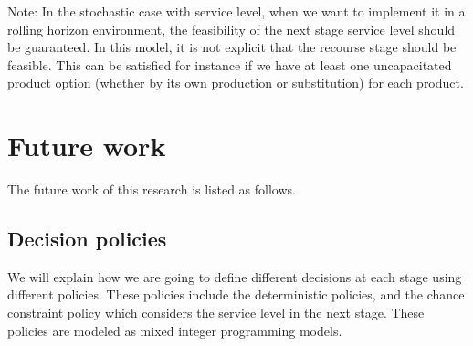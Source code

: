 \documentclass[10pt]{article}
\newcommand{\Es}{S} %
\newcommand{\cred}{\color{red!65!black}}
\begin{document}
 Note: In the stochastic case with service level, when we want to implement it in a rolling horizon environment, the feasibility of the next stage service level should be guaranteed.  In this model, it is not explicit that the recourse stage should be feasible. This can be satisfied for instance if we have at least one uncapacitated product option (whether by its own production or substitution) for each product. 






\section{Future work}

The future work of this research is listed as follows.

\subsection{Decision policies}
We will explain how we are going to define different decisions at each stage using different policies. These policies include the deterministic policies, and the chance constraint policy which considers the service level in the next stage. These policies are modeled as mixed integer programming models.
\end{document}

